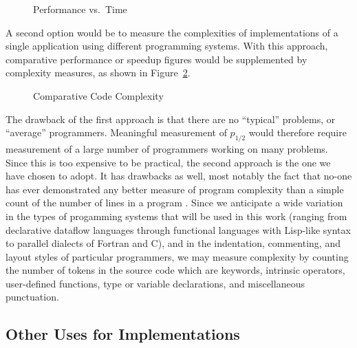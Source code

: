 \begin{figure}
\epsfxsize=12cm
\begin{center}\mbox{}\end{center}
\caption{Performance vs.\ Time\label{f:perf}}
\end{figure}

A second option would be to measure the complexities of
implementations of a single application using different programming systems.
With this approach,
comparative performance or speedup figures would be supplemented by complexity measures,
as shown in Figure~\ref{f:complex}.

\begin{figure}
\epsfxsize=6cm
\begin{center}\mbox{}\end{center}
\caption{Comparative Code Complexity\label{f:complex}}
\end{figure}

The drawback of the first approach is that there are no ``typical'' problems,
or ``average'' programmers.
Meaningful measurement of  $p_{1/2}$ would therefore require
measurement of a large number of programmers working on many problems.
Since this is too expensive to be practical,
the second approach is the one we have chosen to adopt.
It has drawbacks as well,
most notably the fact that no-one has ever demonstrated any better measure of program complexity
than a simple count of the number of lines in a program \cite{b:fenton-metrics}.
Since we anticipate a wide variation in the types of progamming systems that will be used in this work
(ranging from declarative dataflow languages
through functional languages with Lisp-like syntax
to parallel dialects of Fortran and C),
and in the indentation, commenting, and layout styles of particular programmers,
we may measure complexity by counting the number of tokens in the source code which are
keywords,
intrinsic operators,
user-defined functions,
type or variable declarations,
and miscellaneous punctuation.

\subsection{Other Uses for Implementations\label{s:method-uses}}


